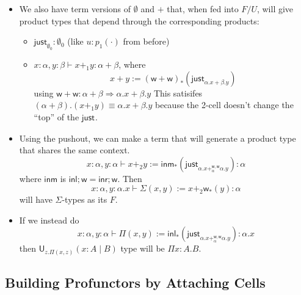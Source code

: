 \documentclass[10pt]{article}
\newcommand\U[3]{\ensuremath{\mathsf{U}_{#1}(#2 \mid #3)}}
\newcommand\just[1]{\ensuremath{\textsf{just}_{#1}}}
\newcommand\Pushout[5]{\ensuremath{#1 +^{#4,#5}_{#2} #3}}
\begin{document}
\begin{itemize}
\item 

We also have term versions of $\emptyset$ and $+$ that, when fed into
$F/U$, will give product types that depend through the corresponding
products:
\begin{itemize}
\item $\just{\emptyset_0} : \emptyset_0$ (like $u : p_1(\cdot)$ from
  before)

\item $x : \alpha, y : \beta \vdash x +_1 y : \alpha + \beta$, where 
\[x + y := (\mathsf{w} + \mathsf{w})_* (\just{\alpha.x + \beta.y})
\]
using $\mathsf{w} + \mathsf{w} : \alpha + \beta \Rightarrow {\alpha.x +
  \beta.y}$ This satisifes $(\alpha+\beta).(x +_1 y) \equiv \alpha.x +
\beta.y$ because the 2-cell doesn't change the ``top'' of the \just{}.
\end{itemize}

\item Using the pushout, we can make a term that will generate a product type
that shares the same context.
\[
x : \alpha, y : \alpha \vdash x +_2 y := 
\mathsf{inm}_*(\just{\Pushout{\alpha.x}{\alpha}{\alpha.y}{\mathsf{w}}{\mathsf{w}}})
: \alpha
\]
where $\mathsf{inm}$ is $\mathsf{inl};\mathsf{w} =
\mathsf{inr};\mathsf{w}$.   Then 
\[
x : \alpha, y : \alpha.x \vdash \Sigma(x,y) := x +_2 \mathsf{w}_*(y) : \alpha
\]
will have $\Sigma$-types as its $F$.  

\item If we instead do 
\[
x : \alpha, y : \alpha \vdash \Pi(x,y) := 
\mathsf{inl}_*(\just{\Pushout{\alpha.x}{\alpha}{\alpha.y}{\mathsf{w}}{\mathsf{w}}})
: \alpha.x
\]
then \U{z.\Pi(x,z)}{x:A}{B} type will be $\Pi x:A.B$.  

\end{itemize}

\subsection{Building Profunctors by Attaching Cells}
\end{document}
